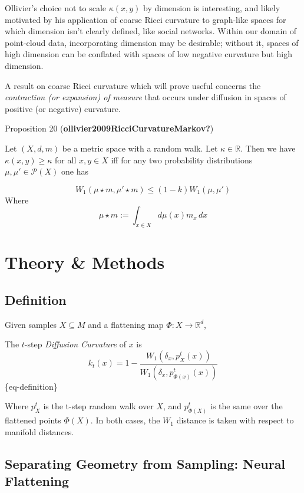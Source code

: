 \documentclass[
]{agujournal2019}
\begin{document}
Ollivier's choice not to scale \(\kappa(x,y)\) by dimension is
interesting, and likely motivated by his application of coarse Ricci
curvature to graph-like spaces for which dimension isn't clearly
defined, like social networks. Within our domain of point-cloud data,
incorporating dimension may be desirable; without it, spaces of high
dimension can be conflated with spaces of low negative curvature but
high dimension.

A result on coarse Ricci curvature which will prove useful concerns the
\emph{contraction (or expansion) of measure} that occurs under diffusion
in spaces of positive (or negative) curvature.

Proposition 20 (\textbf{ollivier2009RicciCurvatureMarkov?})

Let \((X,d,m)\) be a metric space with a random walk. Let
\(\kappa \in \mathbb{R}\). Then we have \(\kappa(x,y) \geq \kappa\) for
all \(x,y \in X\) iff for any two probability distributions
\(\mu, \mu' \in \mathcal{P}(X)\) one has

\[
W_{1}(\mu \star m, \mu' \star m) \leq (1-k)W_{1}(\mu, \mu')
\] Where \[
 \mu \star m := \int_{{x \in X}} d\mu(x)m_{x} \, dx
\]

\section{Theory \& Methods}\label{theory-methods}

\subsection{Definition}\label{definition}

Given samples \(X \subseteq M\) and a flattening map
\(\Phi: X \rightarrow \mathbb{R}^d\),

The \(t\)-step \emph{Diffusion Curvature} of \(x\) is \[
k_t(x)=1-\frac{W_1\left(\delta_x, p_X^t(x)\right)}{W_1\left(\delta_x, p_{\Phi(x)}^t(x)\right)}
\]\{eq-definition\}

Where \(p_X^t\) is the t-step random walk over \(X\), and
\(p_{\Phi(X)}^t\) is the same over the flattened points \(\Phi(X)\). In
both cases, the \(W_1\) distance is taken with respect to manifold
distances.

\subsection{Separating Geometry from Sampling: Neural
Flattening}\label{separating-geometry-from-sampling-neural-flattening}
\end{document}
